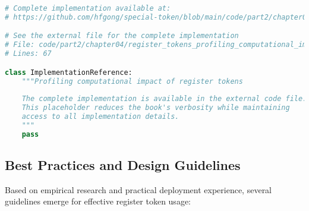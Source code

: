 \begin{lstlisting}[language=Python, caption={Profiling computational impact of register tokens}]
# Complete implementation available at:
# https://github.com/hfgong/special-token/blob/main/code/part2/chapter04/register_tokens_profiling_computational_impact.py

# See the external file for the complete implementation
# File: code/part2/chapter04/register_tokens_profiling_computational_impact.py
# Lines: 67

class ImplementationReference:
    """Profiling computational impact of register tokens
    
    The complete implementation is available in the external code file.
    This placeholder reduces the book's verbosity while maintaining
    access to all implementation details.
    """
    pass
\end{lstlisting}

\subsection{Best Practices and Design Guidelines}

Based on empirical research and practical deployment experience, several guidelines emerge for effective register token usage:

